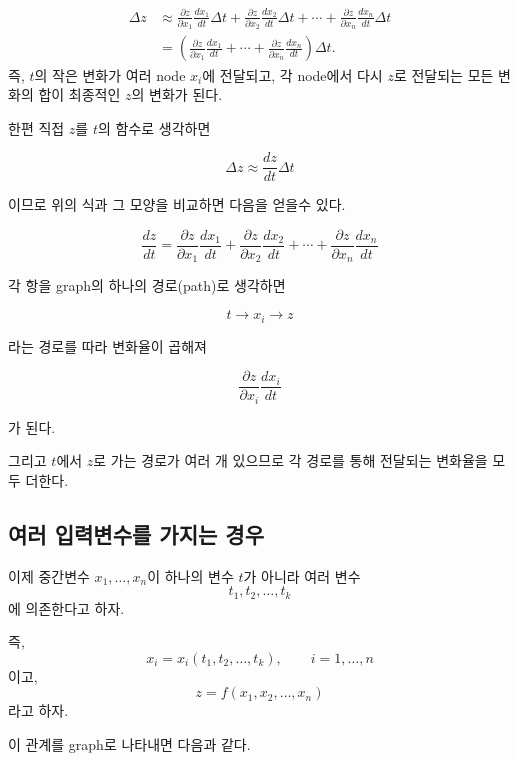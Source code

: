\documentclass[11pt,a4paper]{article}
\begin{document}
\[
\begin{aligned}
\Delta z
&\approx
\frac{\partial z}{\partial x_1}
\frac{dx_1}{dt}\Delta t
+
\frac{\partial z}{\partial x_2}
\frac{dx_2}{dt}\Delta t
+\cdots
+
\frac{\partial z}{\partial x_n}
\frac{dx_n}{dt}\Delta t
\\[0.5em]
&=
\left(
\frac{\partial z}{\partial x_1}
\frac{dx_1}{dt}
+
\cdots+
\frac{\partial z}{\partial x_n}
\frac{dx_n}{dt}
\right)\Delta t .
\end{aligned}
\]
즉, $t$의 작은 변화가 여러 node $x_i$에 전달되고,
각 node에서 다시 $z$로 전달되는 모든 변화의 합이
최종적인 $z$의 변화가 된다.

한편 직접 $z$를 $t$의 함수로 생각하면

\[
\Delta z
\approx
\frac{dz}{dt}\Delta t
\]

이므로 위의 식과 그 모양을 비교하면 다음을 얻을수 있다.

\[
\boxed{
\frac{dz}{dt}
=
\frac{\partial z}{\partial x_1}
\frac{dx_1}{dt}
+
\frac{\partial z}{\partial x_2}
\frac{dx_2}{dt}
+\cdots+
\frac{\partial z}{\partial x_n}
\frac{dx_n}{dt}
}
\]




각 항을 graph의 하나의 경로(path)로 생각하면

\[
t\longrightarrow x_i\longrightarrow z
\]

라는 경로를 따라 변화율이 곱해져

\[
\frac{\partial z}{\partial x_i}
\frac{dx_i}{dt}
\]

가 된다.

그리고 $t$에서 $z$로 가는 경로가 여러 개 있으므로
각 경로를 통해 전달되는 변화율을 모두 더한다.


\subsection{여러 입력변수를 가지는 경우}

이제 중간변수 $x_1,\ldots,x_n$이 하나의 변수 $t$가 아니라
여러 변수
\[
t_1,t_2,\ldots,t_k
\]
에 의존한다고 하자.

즉,
\[
x_i=x_i(t_1,t_2,\ldots,t_k),
\qquad
i=1,\ldots,n
\]
이고,
\[
z=f(x_1,x_2,\ldots,x_n)
\]
라고 하자.

이 관계를 graph로 나타내면 다음과 같다.
\end{document}
